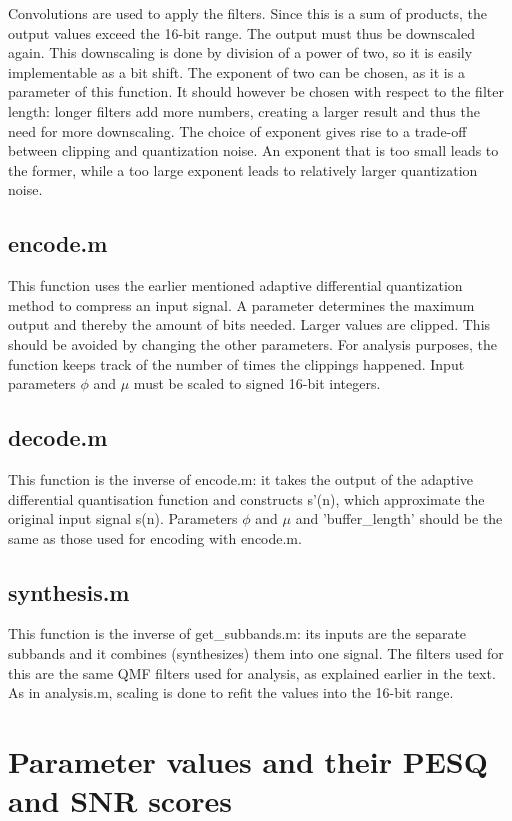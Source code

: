 \documentclass[a4paper]{article}
\begin{document}
Convolutions are used to apply the filters. Since this is a sum of products, the output values exceed the 16-bit range. The output must thus be downscaled again. This downscaling is done by division of a power of two, so it is easily implementable as a bit shift. The exponent of two can be chosen, as it is a parameter of this function. It should however be chosen with respect to the filter length: longer filters add more numbers, creating a larger result and thus the need for more downscaling. The choice of exponent gives rise to a trade-off between clipping and quantization noise. An exponent that is too small leads to the former, while a too large exponent leads to relatively larger quantization noise.

\subsection{encode.m}
This function uses the earlier mentioned adaptive differential quantization method to compress an input signal. A parameter determines the maximum output and thereby the amount of bits needed. Larger values are clipped. This should be avoided by changing the other parameters. For analysis purposes, the function keeps track of the number of times the clippings happened. Input parameters $\phi$ and $\mu$ must be scaled to signed 16-bit integers.

\subsection{decode.m}
This function is the inverse of encode.m: it takes the output of the adaptive differential quantisation function and constructs s'(n), which approximate the original input signal s(n). Parameters $\phi$ and $\mu$ and 'buffer\_length' should be the same as those used for encoding with encode.m.


\subsection{synthesis.m}
This function is the inverse of get\_subbands.m: its inputs are the separate subbands and it combines (synthesizes) them into one signal. The filters used for this are the same QMF filters used for analysis, as explained earlier in the text. As in analysis.m, scaling is done to refit the values into the 16-bit range.

\section{Parameter values and their PESQ and SNR scores}
\end{document}
